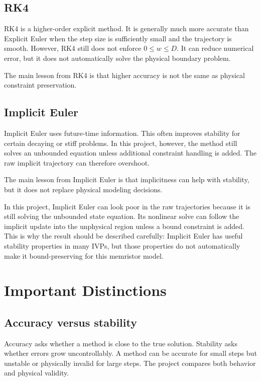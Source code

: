 \documentclass[11pt]{article}
\begin{document}
\subsection{RK4}

RK4 is a higher-order explicit method. It is generally much more accurate than Explicit Euler when the step size is sufficiently small and the trajectory is smooth. However, RK4 still does not enforce \(0 \leq w \leq D\). It can reduce numerical error, but it does not automatically solve the physical boundary problem.

The main lesson from RK4 is that higher accuracy is not the same as physical constraint preservation.

\subsection{Implicit Euler}

Implicit Euler uses future-time information. This often improves stability for certain decaying or stiff problems. In this project, however, the method still solves an unbounded equation unless additional constraint handling is added. The raw implicit trajectory can therefore overshoot.

The main lesson from Implicit Euler is that implicitness can help with stability, but it does not replace physical modeling decisions.

In this project, Implicit Euler can look poor in the raw trajectories because it is still solving the unbounded state equation. Its nonlinear solve can follow the implicit update into the unphysical region unless a bound constraint is added. This is why the result should be described carefully: Implicit Euler has useful stability properties in many IVPs, but those properties do not automatically make it bound-preserving for this memristor model.

\section{Important Distinctions}

\subsection{Accuracy versus stability}

Accuracy asks whether a method is close to the true solution. Stability asks whether errors grow uncontrollably. A method can be accurate for small steps but unstable or physically invalid for large steps. The project compares both behavior and physical validity.
\end{document}
